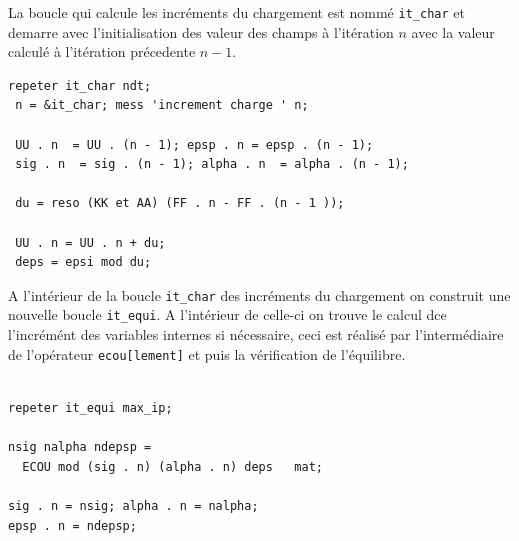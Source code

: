 \begin{castemcom}
La boucle qui calcule les incréments du chargement 
est nommé \texttt{it\_char} et demarre avec l'initialisation 
des valeur des champs à l'itération $n$ avec la valeur 
calculé à l'itération précedente $n - 1$.   
\end{castemcom}
\begin{castemlines}
\begin{verbatim}
repeter it_char ndt;
 n = &it_char; mess 'increment charge ' n;
    
 UU . n  = UU . (n - 1); epsp . n = epsp . (n - 1);    
 sig . n  = sig . (n - 1); alpha . n  = alpha . (n - 1);   
 
 du = reso (KK et AA) (FF . n - FF . (n - 1 )); 
    
 UU . n = UU . n + du;
 deps = epsi mod du;

\end{verbatim}
\end{castemlines}

\pagebreak

\begin{castemcom}
A l'intérieur de la boucle \texttt{it\_char}  des incréments du chargement 
on construit une nouvelle boucle \texttt{it\_equi}. A l'intérieur de celle-ci 
on trouve le calcul dce l'incrémént des variables internes si nécessaire,
ceci est réalisé par l'intermédiaire de l'opérateur \texttt{ecou[lement]}
et  puis la vérification de l'équilibre.
\end{castemcom}
\begin{castemlines}
\begin{verbatim}
 
repeter it_equi max_ip;

nsig nalpha ndepsp = 
  ECOU mod (sig . n) (alpha . n) deps   mat;

sig . n = nsig; alpha . n = nalpha;
epsp . n = ndepsp;
  
\end{verbatim}
\end{castemlines}

